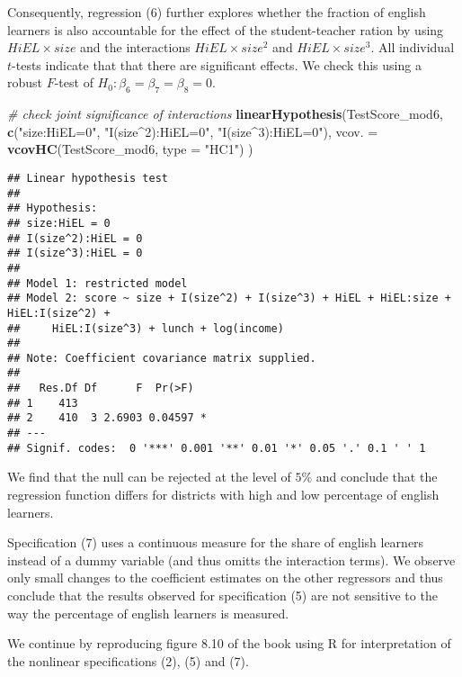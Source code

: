 \documentclass[]{book}
\newenvironment{Shaded}{\begin{snugshade}}{\end{snugshade}}
\newcommand{\KeywordTok}[1]{\textcolor[rgb]{0.13,0.29,0.53}{\textbf{#1}}}
\newcommand{\DataTypeTok}[1]{\textcolor[rgb]{0.13,0.29,0.53}{#1}}
\newcommand{\StringTok}[1]{\textcolor[rgb]{0.31,0.60,0.02}{#1}}
\newcommand{\CommentTok}[1]{\textcolor[rgb]{0.56,0.35,0.01}{\textit{#1}}}
\newcommand{\NormalTok}[1]{#1}
\theoremstyle{definition}
\theoremstyle{definition}
\theoremstyle{definition}
\theoremstyle{remark}
\begin{document}
Consequently, regression (6) further explores whether the fraction of
english learners is also accountable for the effect of the
student-teacher ration by using \(HiEL \times size\) and the
interactions \(HiEL \times size^2\) and \(HiEL \times size^3\). All
individual \(t\)-tests indicate that that there are significant effects.
We check this using a robust \(F\)-test of
\(H_0: \beta_6=\beta_7=\beta_8=0\).

\begin{Shaded}
\begin{Highlighting}[]
\CommentTok{# check joint significance of interactions}
\KeywordTok{linearHypothesis}\NormalTok{(TestScore_mod6, }
                 \KeywordTok{c}\NormalTok{(}\StringTok{"size:HiEL=0"}\NormalTok{, }\StringTok{"I(size^2):HiEL=0"}\NormalTok{, }\StringTok{"I(size^3):HiEL=0"}\NormalTok{),}
                 \DataTypeTok{vcov. =} \KeywordTok{vcovHC}\NormalTok{(TestScore_mod6, }\DataTypeTok{type =} \StringTok{"HC1"}\NormalTok{)}
\NormalTok{                 )}
\end{Highlighting}
\end{Shaded}

\begin{verbatim}
## Linear hypothesis test
## 
## Hypothesis:
## size:HiEL = 0
## I(size^2):HiEL = 0
## I(size^3):HiEL = 0
## 
## Model 1: restricted model
## Model 2: score ~ size + I(size^2) + I(size^3) + HiEL + HiEL:size + HiEL:I(size^2) + 
##     HiEL:I(size^3) + lunch + log(income)
## 
## Note: Coefficient covariance matrix supplied.
## 
##   Res.Df Df      F  Pr(>F)  
## 1    413                    
## 2    410  3 2.6903 0.04597 *
## ---
## Signif. codes:  0 '***' 0.001 '**' 0.01 '*' 0.05 '.' 0.1 ' ' 1
\end{verbatim}

We find that the null can be rejected at the level of \(5\%\) and
conclude that the regression function differs for districts with high
and low percentage of english learners.

Specification (7) uses a continuous measure for the share of english
learners instead of a dummy variable (and thus omitts the interaction
terms). We observe only small changes to the coefficient estimates on
the other regressors and thus conclude that the results observed for
specification (5) are not sensitive to the way the percentage of english
learners is measured.

We continue by reproducing figure 8.10 of the book using R for
interpretation of the nonlinear specifications (2), (5) and (7).
\end{document}
